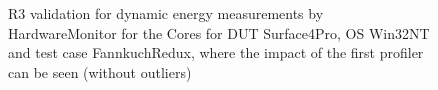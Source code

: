 \begin{figure}
                            \caption{R3 validation for dynamic energy measurements by HardwareMonitor for the Cores for DUT Surface4Pro, OS Win32NT and test case FannkuchRedux, where the impact of the first profiler can be seen (without outliers)} \label{fig:Surface4Pro_HardwareMonitor_Cores_R3_dynamic_energy_without_outliers_Win32NT_avg_watts}
                            \end{figure}
                            